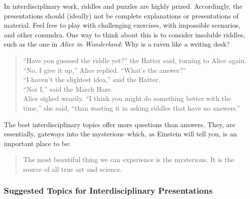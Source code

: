 \documentclass[letterpaper,10pt,headsepline]{scrreprt}
\begin{document}
In interdisciplinary work, riddles and puzzles are highly prized.
Accordingly, the presentations should (ideally) not be complete
explanations or presentations of material. Feel free to play with
challenging exercises, with impossible scenarios, and other conundra.
One way to think about this is to consider insoluble riddles, such as
the one in \textit{Alice in Wonderland}: Why is a raven like a
writing desk?

\begin{quote}
  ``Have you guessed the riddle yet?'' the Hatter said, turning to Alice again.\\
``No, I give it up,'' Alice replied. ``What's the answer?''\\
``I haven't the slightest idea,'' said the Hatter.\\
``Nor I,'' said the March Hare.\\
Alice sighed wearily. ``I think you might do something better with the time,'' she said, ``than wasting it in asking riddles that have no answers.''
\end{quote}

The best interdisciplinary topics offer more questions than answers.
They, are essentially, gateways into the mysterious--which, as
Einstein will tell you, is an important place to be:

\begin{quote}
  The most beautiful thing we can experience is the mysterious. It is
  the source of all true art and science.
\end{quote}

\subsubsection{Suggested Topics for Interdisciplinary Presentations}
\end{document}
